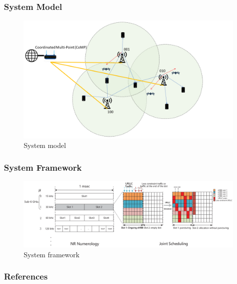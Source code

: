 \documentclass{beamer}
\begin{document}
\begin{frame}
  \frametitle{System Model}
  \begin{figure}
    \includegraphics[width=\textwidth]{system_model}
    \caption{System model}
  \end{figure}
\end{frame}

\begin{frame}
  \frametitle{System Framework}
  \begin{figure}
    \includegraphics[width=\textwidth]{system_framework}
    \caption{System framework}
  \end{figure}
\end{frame}

\begin{frame}
  \frametitle{References}
  \printbibliography[heading=none]
\end{frame}
\end{document}
